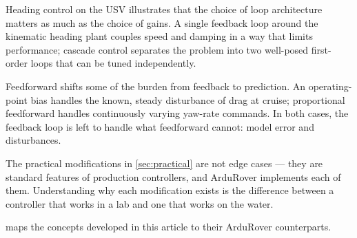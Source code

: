 \documentclass[../../book.tex]{subfiles}
\begin{document}
Heading control on the USV illustrates that the choice of loop architecture
matters as much as the choice of gains.  A single feedback loop around the
kinematic heading plant couples speed and damping in a way that limits
performance; cascade control separates the problem into two well-posed
first-order loops that can be tuned independently.

Feedforward shifts some of the burden from feedback to prediction.  An
operating-point bias handles the known, steady disturbance of drag at cruise;
proportional feedforward handles continuously varying yaw-rate commands.  In
both cases, the feedback loop is left to handle what feedforward cannot: model
error and disturbances.

The practical modifications in \cref{sec:practical} are not edge cases --- they
are standard features of production controllers, and ArduRover implements each
of them.  Understanding why each modification exists is the difference between
a controller that works in a lab and one that works on the water.

 maps the concepts developed in this article to their
ArduRover counterparts.
\end{document}
